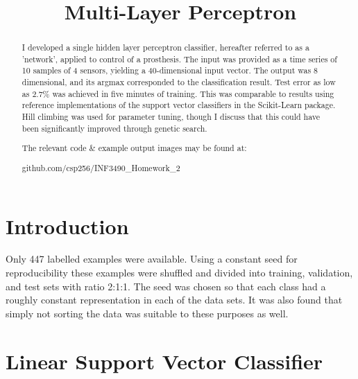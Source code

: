 \documentclass[10pt, conference, compsocconf]{IEEEtran}
\begin{document}
\title{Multi-Layer Perceptron}
\author{
}
\maketitle


\begin{abstract}
I developed a single hidden layer perceptron classifier, hereafter referred to as a 'network', applied to control of a prosthesis. The input was provided as a time series of 10 samples of 4 sensors, yielding a 40-dimensional input vector. The output was 8 dimensional, and its argmax corresponded to the classification result. Test error as low as 2.7\% was achieved in five minutes of training. This was comparable to results using reference implementations of the support vector classifiers in the Scikit-Learn package. Hill climbing was used for parameter tuning, though I discuss that this could have been significantly improved through genetic search.

The relevant code \& example output images may be found at: 

\centerline{github.com/csp256/INF3490\_Homework\_2}
\end{abstract}

\IEEEpeerreviewmaketitle


\section{Introduction}

Only 447 labelled examples were available. Using a constant seed for reproducibility these examples were shuffled and divided into training, validation, and test sets with ratio 2:1:1. The seed was chosen so that each class had a roughly constant representation in each of the data sets. It was also found that simply not sorting the data was suitable to these purposes as well.

\section{Linear Support Vector Classifier}
\end{document}
